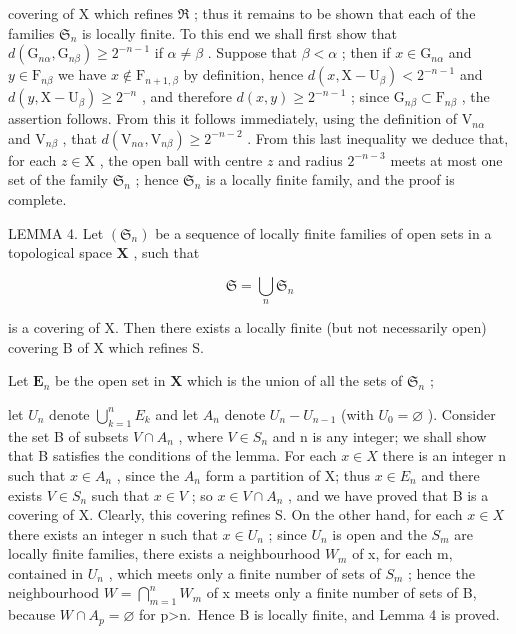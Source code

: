 covering of X which refines \(\Re\) ; thus it remains to be shown that each of the families \(\mathfrak{S}_n\) is locally finite. To this end we shall first show that \(d(\mathrm{G}_{n\alpha}, \mathrm{G}_{n\beta}) \geqslant 2^{-n-1}\) if \(\alpha \neq \beta\) . Suppose that \(\beta < \alpha\) ; then if \(x \in \mathrm{G}_{n\alpha}\) and \(y \in \mathrm{F}_{n\beta}\) we have \(x \notin \mathrm{F}_{n+1, \beta}\) by definition, hence \(d(x, \mathrm{X} - \mathrm{U}_{\beta}) < 2^{-n-1}\) and \(d(y, \mathrm{X} - \mathrm{U}_{\beta}) \geqslant 2^{-n}\) , and therefore \(d(x, y) \geqslant 2^{-n-1}\) ; since \(\mathrm{G}_{n\beta} \subset \mathrm{F}_{n\beta}\) , the assertion follows. From this it follows immediately, using the definition of \(\mathrm{V}_{n\alpha}\) and \(\mathrm{V}_{n\beta}\) , that \(d(\mathrm{V}_{n\alpha}, \mathrm{V}_{n\beta}) \geqslant 2^{-n-2}\) . From this last inequality we deduce that, for each \(z \in \mathrm{X}\) , the open ball with centre \(z\) and radius \(2^{-n-3}\) meets at most one set of the family \(\mathfrak{S}_n\) ; hence \(\mathfrak{S}_n\) is a locally finite family, and the proof is complete.

LEMMA 4. Let \((\mathfrak{S}_n)\) be a sequence of locally finite families of open sets in a topological space \(\mathbf{X}\) , such that

\[
\mathfrak {S} = \bigcup_ {n} \mathfrak {S} _ {n}
\]

is a covering of X. Then there exists a locally finite (but not necessarily open) covering B of X which refines S.

Let \(\mathbf{E}_n\) be the open set in \(\mathbf{X}\) which is the union of all the sets of \(\mathfrak{S}_n\) ;

let \(U_{n}\) denote \(\bigcup_{k=1}^{n}E_{k}\) and let \(A_{n}\) denote \(U_{n}-U_{n-1}\) (with \(U_{0}=\varnothing\) ). Consider the set B of subsets \(V\cap A_{n}\) , where \(V\in S_{n}\) and n is any integer; we shall show that B satisfies the conditions of the lemma. For each \(x\in X\) there is an integer n such that \(x\in A_{n}\) , since the \(A_{n}\) form a partition of X; thus \(x\in E_{n}\) and there exists \(V\in S_{n}\) such that \(x\in V\) ; so \(x\in V\cap A_{n}\) , and we have proved that B is a covering of X. Clearly, this covering refines S. On the other hand, for each \(x\in X\) there exists an integer n such that \(x\in U_{n}\) ; since \(U_{n}\) is open and the \(S_{m}\) are locally finite families, there exists a neighbourhood \(W_{m}\) of x, for each m, contained in \(U_{n}\) , which meets only a finite number of sets of \(S_{m}\) ; hence the neighbourhood \(W=\bigcap_{m=1}^{n}W_{m}\) of x meets only a finite number of sets of B, because \(W\cap A_{p}=\varnothing\) for p\textgreater n.~Hence B is locally finite, and Lemma 4 is proved.


